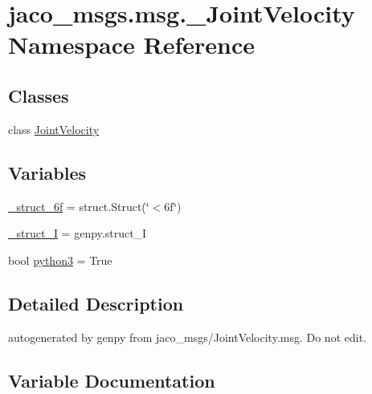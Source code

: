 \hypertarget{namespacejaco__msgs_1_1msg_1_1__JointVelocity}{}\section{jaco\+\_\+msgs.\+msg.\+\_\+\+Joint\+Velocity Namespace Reference}
\label{namespacejaco__msgs_1_1msg_1_1__JointVelocity}
\subsection*{Classes}
\begin{DoxyCompactItemize}
\item 
class \hyperlink{classjaco__msgs_1_1msg_1_1__JointVelocity_1_1JointVelocity}{Joint\+Velocity}
\end{DoxyCompactItemize}
\subsection*{Variables}
\begin{DoxyCompactItemize}
\item 
\hyperlink{namespacejaco__msgs_1_1msg_1_1__JointVelocity_a2bd1ce007bb089a1259f036271acdb9e}{\+\_\+struct\+\_\+6f} = struct.\+Struct(\char`\"{}$<$6f\char`\"{})
\item 
\hyperlink{namespacejaco__msgs_1_1msg_1_1__JointVelocity_ae2c089c5558cc1bad8df98f1c436ef0d}{\+\_\+struct\+\_\+I} = genpy.\+struct\+\_\+I
\item 
bool \hyperlink{namespacejaco__msgs_1_1msg_1_1__JointVelocity_af9550ebf352d8e8bbccb72e0e94940f2}{python3} = True
\end{DoxyCompactItemize}


\subsection{Detailed Description}
\begin{DoxyVerb}autogenerated by genpy from jaco_msgs/JointVelocity.msg. Do not edit.\end{DoxyVerb}
 

\subsection{Variable Documentation}
